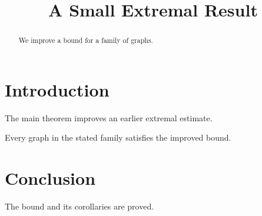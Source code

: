 \title{A Small Extremal Result}
\begin{abstract}
We improve a bound for a family of graphs.
\end{abstract}
\section{Introduction}
The main theorem improves an earlier extremal estimate.
\begin{theorem}\label{thm:main}
Every graph in the stated family satisfies the improved bound.
\end{theorem}
\section{Conclusion}
The bound and its corollaries are proved.
